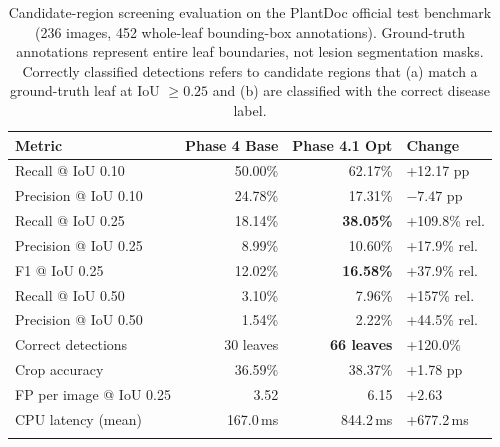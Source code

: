 \documentclass[pdflatex,sn-mathphys-num]{sn-jnl}
\theoremstyle{thmstyleone}%
\theoremstyle{thmstyletwo}%
\theoremstyle{thmstylethree}%
\begin{document}
\begin{table}[h]
\caption{Candidate-region screening evaluation on the PlantDoc official test benchmark
(236 images, 452 whole-leaf bounding-box annotations). Ground-truth annotations
represent entire leaf boundaries, not lesion segmentation masks. Correctly classified
detections refers to candidate regions that (a) match a ground-truth leaf at
IoU $\geq 0.25$ and (b) are classified with the correct disease label.}\label{tab:screening_results}%
\setlength{\tabcolsep}{3.5pt}%
\begin{tabular*}{\textwidth}{@{\extracolsep\fill}p{4.2cm}rrp{2.2cm}}
\toprule
\textbf{Metric} & \textbf{Phase 4 Base} & \textbf{Phase 4.1 Opt} & \textbf{Change} \\
\midrule
Recall @ IoU 0.10        & 50.00\% & 62.17\% & +12.17 pp \\
Precision @ IoU 0.10     & 24.78\% & 17.31\% & $-7.47$ pp \\
Recall @ IoU 0.25        & 18.14\% & \textbf{38.05\%} & +109.8\% rel. \\
Precision @ IoU 0.25     &  8.99\% & 10.60\% & +17.9\% rel. \\
F1 @ IoU 0.25            & 12.02\% & \textbf{16.58\%} & +37.9\% rel. \\
Recall @ IoU 0.50        &  3.10\% &  7.96\% & +157\% rel. \\
Precision @ IoU 0.50     &  1.54\% &  2.22\% & +44.5\% rel. \\
Correct detections       & 30 leaves & \textbf{66 leaves} & +120.0\% \\
Crop accuracy            & 36.59\% & 38.37\% & +1.78 pp \\
FP per image @ IoU 0.25  &  3.52 &  6.15 & $+2.63$ \\
CPU latency (mean)       & 167.0\,ms & 844.2\,ms & +677.2\,ms \\
\botrule
\end{tabular*}
\end{table}
\end{document}
